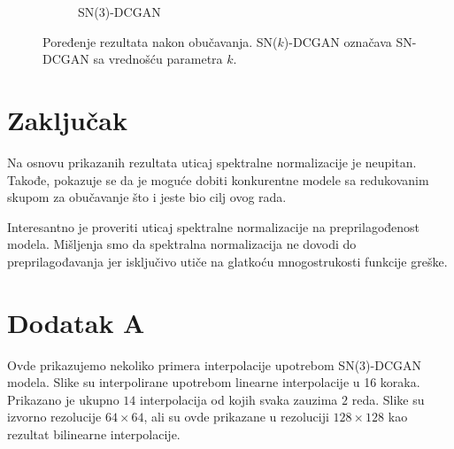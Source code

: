 \documentclass[12pt, a4paper]{article}
\begin{document}
\begin{figure}[H]
\begin{subfigure}[b]{0.475\textwidth}
		\caption[]%
		{{\small SN(3)-DCGAN}}    
		\label{fig:mean and std of net44}
	\end{subfigure}
	\caption[]
	{\small Poređenje rezultata nakon obučavanja. SN($k$)-DCGAN označava SN-DCGAN sa vrednošću parametra $k$.} 
	\label{fig:comparison}
\end{figure}

\section{Zaključak}
Na osnovu prikazanih rezultata uticaj spektralne normalizacije je neupitan. Takođe, pokazuje se da je moguće dobiti konkurentne modele sa redukovanim skupom za obučavanje što i jeste bio cilj ovog rada.

Interesantno je proveriti uticaj spektralne normalizacije na preprilagođenost modela. Mišljenja smo da spektralna normalizacija ne dovodi do preprilagođavanja jer isključivo utiče na glatkoću mnogostrukosti funkcije greške.

\section*{Dodatak A}
Ovde prikazujemo nekoliko primera interpolacije upotrebom SN($3$)-DCGAN modela. Slike su interpolirane upotrebom linearne interpolacije u 16 koraka. Prikazano je ukupno $14$ interpolacija od kojih svaka zauzima $2$ reda. Slike su izvorno rezolucije $64 \times 64$, ali su ovde prikazane u rezoluciji $128 \times 128$ kao rezultat bilinearne interpolacije.
\end{document}
